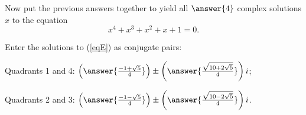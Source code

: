 \documentclass[space,nooutcomes]{ximera}
\begin{document}
\begin{problem}
Now put the previous answers together to yield all $\answer{4}$ complex solutions $x$ to the equation
\begin{equation} \label{eqE}
x^4+x^3+x^2+x+1=0.
\end{equation}

Enter the solutions to (\ref{eqE}) as conjugate pairs: 

Quadrants 1 and 4: $\left(\answer{\frac{-1+\sqrt{5}}{4}}\right) 
     \pm \left(\answer{\frac{\sqrt{10+2\sqrt{5}}}{4}}\right)i$;

Quadrants 2 and 3: $\left(\answer{\frac{-1-\sqrt{5}}{4}}\right)
     \pm \left(\answer{\frac{\sqrt{10-2\sqrt{5}}}{4}}\right)i$.



\end{problem}
\end{document}
